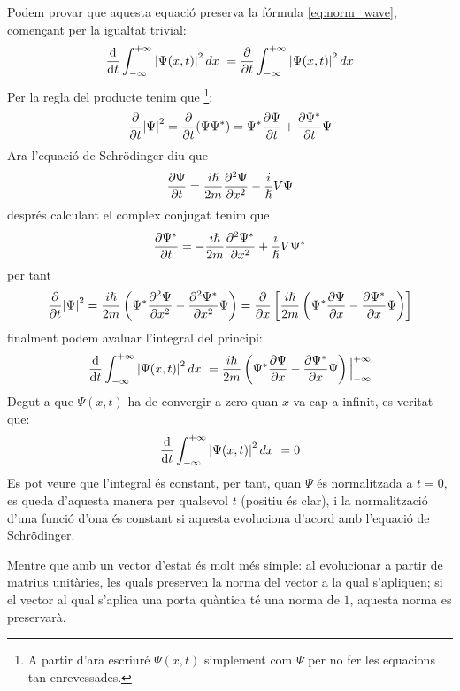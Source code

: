 Podem provar que aquesta equació preserva la fórmula \ref{eq:norm_wave}, començant per la igualtat trivial:
$$
\dv{t} \int_{-\infty}^{+\infty}\abs{\Psi(x,t)}^2\, dx\ = \pdv{t} \int_{-\infty}^{+\infty}\abs{\Psi(x,t)}^2\, dx
$$
Per la regla del producte tenim que \footnote{A partir d'ara escriuré  $\Psi(x,t)$ simplement com $\Psi$ per no fer les equacions tan enrevessades.}:
$$
\pdv{t}\abs{\Psi}^2 = \pdv{t}(\Psi\Psi^*) = \Psi^*\pdv{\Psi}{t} + \pdv{\Psi^*}{t}\Psi
$$
Ara l'equació de Schrödinger diu que
$$
\pdv{\Psi}{t} = \frac{i\hslash}{2m}\pdv[2]{\Psi}{x} -  \frac{i}{\hslash}V\Psi
$$
després calculant el complex conjugat tenim que 
$$
\pdv{\Psi^*}{t} = - \frac{i\hslash}{2m}\pdv[2]{\Psi^*}{x} + \frac{i}{\hslash}V\Psi^*
$$
per tant
$$
\pdv{t}\abs{\Psi}^2 = \frac{i\hslash}{2m} \left( \Psi^*\pdv[2]{\Psi}{x} - \pdv[2]{\Psi^*}{x}\Psi \right) = \pdv{x} \left[ \frac{i\hslash}{2m} \left(\Psi^*\pdv{\Psi}{x} - \pdv{\Psi^*}{x}\Psi\right)\right]
$$
finalment podem avaluar l'integral del principi:
$$
\dv{t} \int_{-\infty}^{+\infty}\abs{\Psi(x,t)}^2\, dx\ = \frac{i\hslash}{2m} \left( \Psi^*\pdv{\Psi}{x} - \pdv{\Psi^*}{x}\Psi \right) \Big|_{-\infty}^{+\infty}
$$
Degut a que $\Psi(x,t)$ ha de convergir a zero quan $x$ va cap a infinit, es veritat que:
$$
\dv{t} \int_{-\infty}^{+\infty}\abs{\Psi(x,t)}^2\, dx\ = 0
$$
Es pot veure que l'integral és constant, per tant, quan $\Psi$ és normalitzada a $t=0$, es queda d'aquesta manera per qualsevol $t$ (positiu és clar), i la normalització d'una funció d'ona és constant si aquesta evoluciona d'acord amb l'equació de Schrödinger.

Mentre que amb un vector d'estat és molt més simple: al evolucionar a partir de matrius unitàries, les quals preserven la norma del vector a la qual s'apliquen; si el vector al qual s'aplica una porta quàntica té una norma de $1$, aquesta norma es preservarà.

